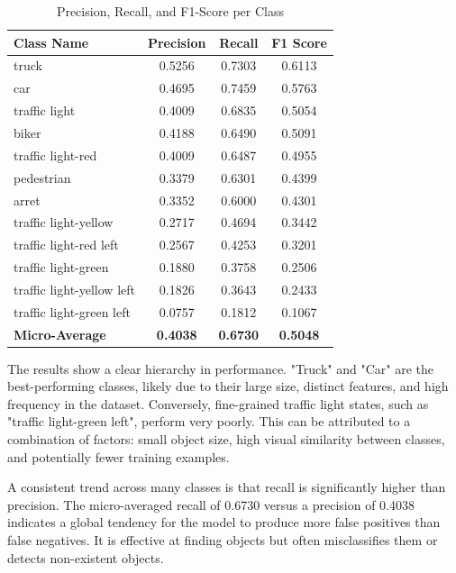 \documentclass[10pt, conference]{IEEEtran}
\begin{document}
\begin{table}[h!]
\centering
\caption{Precision, Recall, and F1-Score per Class}
\label{tab:pr_f1}
\begin{tabular}{@{}lccc@{}}
\toprule
\textbf{Class Name} & \textbf{Precision} & \textbf{Recall} & \textbf{F1 Score} \\ \midrule
truck & 0.5256 & 0.7303 & 0.6113 \\
car & 0.4695 & 0.7459 & 0.5763 \\
traffic light & 0.4009 & 0.6835 & 0.5054 \\
biker & 0.4188 & 0.6490 & 0.5091 \\
traffic light-red & 0.4009 & 0.6487 & 0.4955 \\
pedestrian & 0.3379 & 0.6301 & 0.4399 \\
arret & 0.3352 & 0.6000 & 0.4301 \\
traffic light-yellow & 0.2717 & 0.4694 & 0.3442 \\
traffic light-red left & 0.2567 & 0.4253 & 0.3201 \\
traffic light-green & 0.1880 & 0.3758 & 0.2506 \\
traffic light-yellow left & 0.1826 & 0.3643 & 0.2433 \\
traffic light-green left & 0.0757 & 0.1812 & 0.1067 \\ \midrule
\textbf{Micro-Average} & \textbf{0.4038} & \textbf{0.6730} & \textbf{0.5048} \\ \bottomrule
\end{tabular}
\end{table}

The results show a clear hierarchy in performance. "Truck" and "Car" are the best-performing classes, likely due to their large size, distinct features, and high frequency in the dataset. Conversely, fine-grained traffic light states, such as "traffic light-green left", perform very poorly. This can be attributed to a combination of factors: small object size, high visual similarity between classes, and potentially fewer training examples.

A consistent trend across many classes is that recall is significantly higher than precision. The micro-averaged recall of 0.6730 versus a precision of 0.4038 indicates a global tendency for the model to produce more false positives than false negatives. It is effective at finding objects but often misclassifies them or detects non-existent objects.
\end{document}
